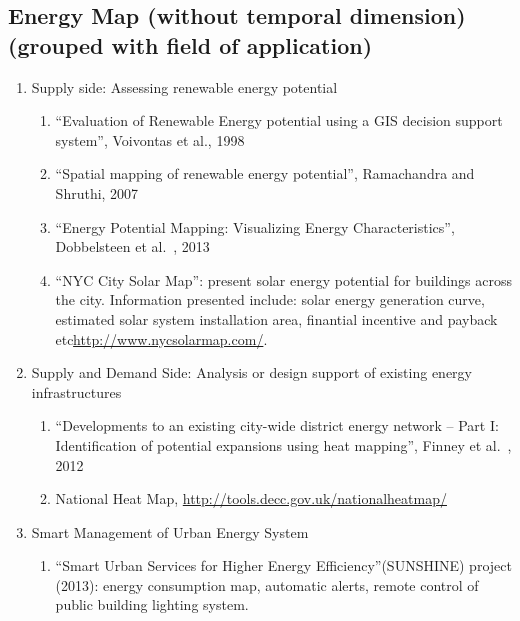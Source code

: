 \documentclass[12pt]{article}
\begin{document}
\subsection{Energy Map (without temporal dimension) (grouped with field
  of application)}
\begin{enumerate}[label*=\arabic*.]
\item Supply side: Assessing renewable energy potential
  \begin{enumerate}[label*=\arabic*.]
  \item ``Evaluation of Renewable Energy potential using a {GIS}
    decision support system'', Voivontas et al., 1998
  \item ``Spatial mapping of renewable energy potential'', Ramachandra
    and Shruthi, 2007
  \item ``Energy Potential Mapping: Visualizing Energy
    Characteristics'', Dobbelsteen et al.\ , 2013
  \item ``NYC City Solar Map'': present solar energy potential for
    buildings across the city. Information presented include: solar
    energy generation curve, estimated solar system installation area,
    finantial incentive and payback etc\url{http://www.nycsolarmap.com/}.
    \end{enumerate}

\item Supply and Demand Side: Analysis or design support of existing energy infrastructures
    \begin{enumerate}[label*=\arabic*.]
    \item ``Developments to an existing city-wide district energy
    network – Part I: Identification of potential expansions using
    heat mapping'', Finney et al.\ , 2012
    \item National Heat Map, \url{http://tools.decc.gov.uk/nationalheatmap/}
    \end{enumerate}
\item Smart Management of Urban Energy System
    \begin{enumerate}[label*=\arabic*.]
    \item ``Smart Urban Services for Higher Energy
    Efficiency''(SUNSHINE) project (2013): energy consumption map,
    automatic alerts, remote control of public building lighting
    system.
    \end{enumerate}
\end{enumerate}
\end{document}
